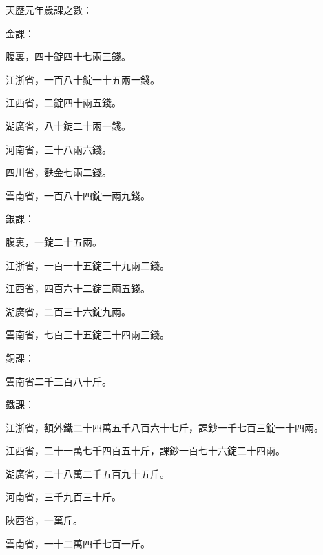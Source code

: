 \begin{pinyinscope}
 天歷元年歲課之數：



 金課：



 腹裏，四十錠四十七兩三錢。



 江浙省，一百八十錠一十五兩一錢。



 江西省，二錠四十兩五錢。



 湖廣省，八十錠二十兩一錢。



 河南省，三十八兩六錢。



 四川省，麩金七兩二錢。



 雲南省，一百八十四錠一兩九錢。



 銀課：



 腹裏，一錠二十五兩。



 江浙省，一百一十五錠三十九兩二錢。



 江西省，四百六十二錠三兩五錢。



 湖廣省，二百三十六錠九兩。



 雲南省，七百三十五錠三十四兩三錢。



 銅課：



 雲南省二千三百八十斤。



 鐵課：



 江浙省，額外鐵二十四萬五千八百六十七斤，課鈔一千七百三錠一十四兩。



 江西省，二十一萬七千四百五十斤，課鈔一百七十六錠二十四兩。



 湖廣省，二十八萬二千五百九十五斤。



 河南省，三千九百三十斤。



 陜西省，一萬斤。



 雲南省，一十二萬四千七百一斤。




\end{pinyinscope}
